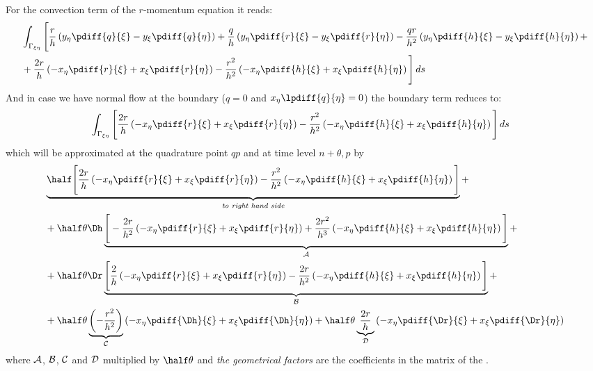 {{        For the convection term of the $r$-momentum equation it reads:
        \begin{align}
            &\int_{\Gamma_{\xi\eta}} \Bigg[
            \frac{r}{h}    \left( y_\eta \pdiff{q}{\xi} - y_\xi \pdiff{q}{\eta} \right)
            + \frac{q}{h}    \left( y_\eta \pdiff{r}{\xi} - y_\xi \pdiff{r}{\eta} \right)
            - \frac{qr}{h^2} \left( y_\eta \pdiff{h}{\xi} - y_\xi \pdiff{h}{\eta} \right)
            +
            \\
            &+ \frac{2r}{h} \left( -x_\eta \pdiff{r}{\xi} + x_\xi \pdiff{r}{\eta} \right)
            - \frac{r^2}{h^2}\left( -x_\eta \pdiff{h}{\xi} + x_\xi \pdiff{h}{\eta} \right)
            \Bigg]\, ds
        \end{align}
        And in case we have normal flow at the boundary ($q=0$ and $x_\eta \lpdiff{q}{\eta}=0$) the boundary term reduces to:
        \begin{align}
            &\int_{\Gamma_{\xi\eta}} \Bigg[
            \frac{2r}{h} \left( -x_\eta \pdiff{r}{\xi} + x_\xi \pdiff{r}{\eta} \right)
            - \frac{r^2}{h^2}\left( -x_\eta \pdiff{h}{\xi} + x_\xi \pdiff{h}{\eta} \right)
            \Bigg]\, ds
        \end{align}
        which will be approximated at the quadrature point $qp$ and at time level ${n+\theta, p}$ by
        \begin{align}
            &\underbrace{\half \Bigg[
                \frac{2r}{h}   \left( -x_\eta \pdiff{r}{\xi} + x_\xi \pdiff{r}{\eta} \right)
                - \frac{r^2}{h^2}\left( -x_\eta \pdiff{h}{\xi} + x_\xi \pdiff{h}{\eta} \right) \Bigg] }_{\textit{to right hand side}} +
            \\*
            & + \half \theta \Dh \underbrace{\Bigg[
                - \frac{2r}{h^2}  \left( -x_\eta \pdiff{r}{\xi} + x_\xi \pdiff{r}{\eta} \right)
                + \frac{2r^2}{h^3} \left( -x_\eta \pdiff{h}{\xi} + x_\xi \pdiff{h}{\eta} \right)
                \Bigg]}_{\cal A} +
            \\*
            & + \half \theta \Dr \underbrace{\Bigg[
                \frac{2}{h}  \left( -x_\eta \pdiff{r}{\xi} + x_\xi \pdiff{r}{\eta} \right)
                - \frac{2r}{h^2} \left( -x_\eta \pdiff{h}{\xi} + x_\xi \pdiff{h}{\eta} \right)   \Bigg]}_{\cal B} +
            \\*
            & + \half \theta  \underbrace{\left( -\frac{r^2}{h^2}\right)}_{\cal C} \left( -x_\eta \pdiff{\Dh}{\xi} + x_\xi \pdiff{\Dh}{\eta} \right)
            + \half \theta \underbrace{\frac{2r}{h}}_{\cal D} \left( -x_\eta \pdiff{\Dr}{\xi} + x_\xi \pdiff{\Dr}{\eta} \right)
        \end{align}
        where $\cal{A}$, $\cal{B}$, $\cal{C}$ and $\cal{D}$ multiplied by $\half\theta$ and \emph{the geometrical factors} are the coefficients in the matrix of the \deltaformulation.

}}
